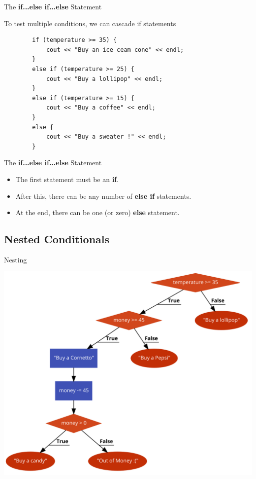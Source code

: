 \begin{frame}[fragile]{The \textbf{if...else if...else} Statement}{}
    \begin{block}{}
        To test multiple conditions, we can cascade if statements
    \end{block}
    \begin{verbatim}
        if (temperature >= 35) {
            cout << "Buy an ice ceam cone" << endl;
        }
        else if (temperature >= 25) {
            cout << "Buy a lollipop" << endl;
        }
        else if (temperature >= 15) {
            cout << "Buy a coffee" << endl;
        }
        else {
            cout << "Buy a sweater !" << endl;
        }
    \end{verbatim}
\end{frame}

\begin{frame}[fragile]{The \textbf{if...else if...else} Statement}{}
    \begin{itemize}
        \item The first statement must be an \textbf{if}.
        \pause
        \item After this, there can be any number of \textbf{else if} statements. 
        \pause
        \item At the end, there can be one (or zero) \textbf{else} statement. 
    \end{itemize}
\end{frame}

\subsection{Nested Conditionals}
\begin{frame}[fragile]{Nesting}{}
    \begin{center}
        \includegraphics[width=0.7\linewidth]{images/nesting.png}
    \end{center}
\end{frame}

